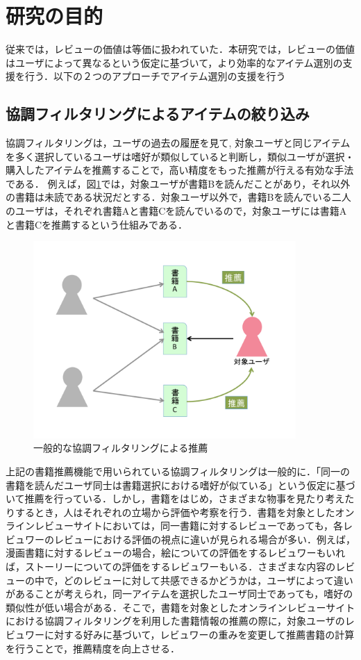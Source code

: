 \documentclass[a4paper,11pt,oneside,openany]{jsbook}
\begin{document}
	\section{研究の目的}
従来では，レビューの価値は等価に扱われていた．本研究では，レビューの価値はユーザによって異なるという仮定に基づいて，より効率的なアイテム選別の支援を行う．以下の２つのアプローチでアイテム選別の支援を行う
\par
\subsection{協調フィルタリングによるアイテムの絞り込み}
協調フィルタリングは，ユーザの過去の履歴を見て, 対象ユーザと同じアイテムを多く選択しているユーザは嗜好が類似していると判断し，類似ユーザが選択・購入したアイテムを推薦することで，高い精度をもった推薦が行える有効な手法である．
例えば，図\ref{fig:kyocho}では，対象ユーザが書籍Bを読んだことがあり，それ以外の書籍は未読である状況だとする．対象ユーザ以外で，書籍Bを読んでいる二人のユーザは，それぞれ書籍Aと書籍Cを読んでいるので，対象ユーザには書籍Aと書籍Cを推薦するという仕組みである．
\begin{figure}[htb]
	\begin{center} %
		\includegraphics[width = 100mm]{figures/kyocho.pdf} %
	\end{center}
	\caption{一般的な協調フィルタリングによる推薦} %
	\label{fig:kyocho} %
\end{figure}
\par
上記の書籍推薦機能で用いられている協調フィルタリングは一般的に．「同一の書籍を読んだユーザ同士は書籍選択における嗜好が似ている」という仮定に基づいて推薦を行っている．しかし，書籍をはじめ，さまざまな物事を見たり考えたりするとき，人はそれぞれの立場から評価や考察を行う．書籍を対象としたオンラインレビューサイトにおいては，同一書籍に対するレビューであっても，各レビュワーのレビューにおける評価の視点に違いが見られる場合が多い．例えば，漫画書籍に対するレビューの場合，絵についての評価をするレビュワーもいれば，ストーリーについての評価をするレビュワーもいる．さまざまな内容のレビューの中で，どのレビューに対して共感できるかどうかは，ユーザによって違いがあることが考えられ，同一アイテムを選択したユーザ同士であっても，嗜好の類似性が低い場合がある．そこで，書籍を対象としたオンラインレビューサイトにおける協調フィルタリングを利用した書籍情報の推薦の際に，対象ユーザのレビュワーに対する好みに基づいて，レビュワーの重みを変更して推薦書籍の計算を行うことで，推薦精度を向上させる．
\end{document}
